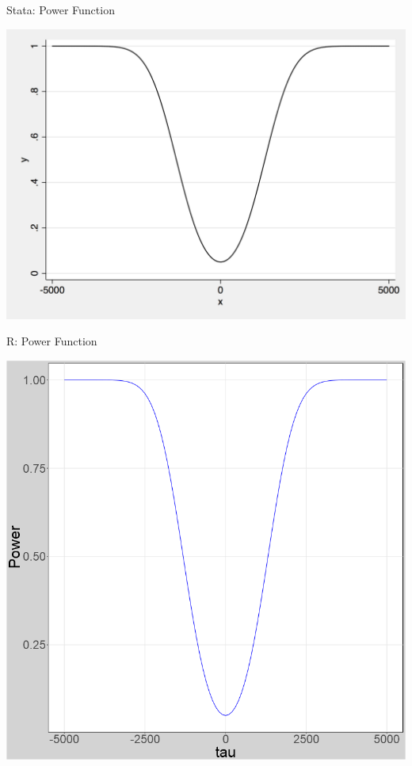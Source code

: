 \documentclass[12pt]{article}
\begin{document}
\subsubsection{}
\begin{center}
  Stata: Power Function
  \par
\includegraphics[totalheight=8cm]{stata_power.png}
\par
R: Power Function
\par
\includegraphics[totalheight=8cm]{power_func_r.png}
\end{center}
\end{document}
